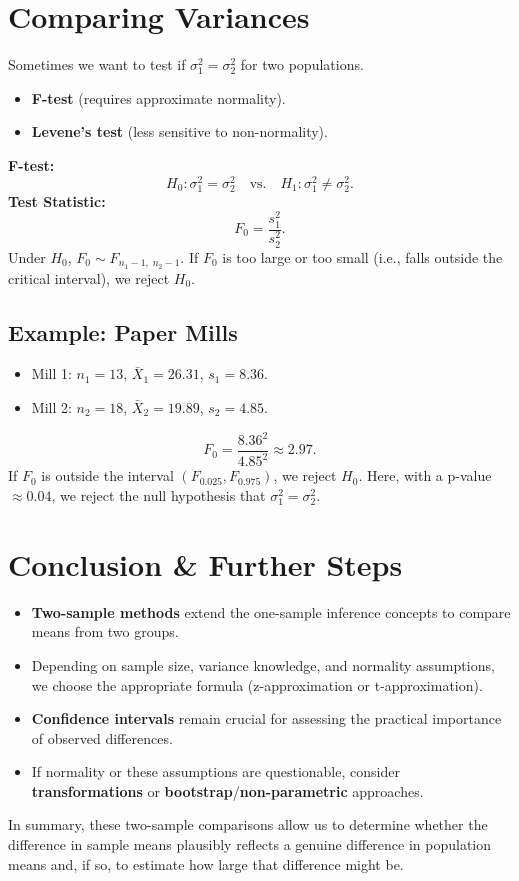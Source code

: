 \documentclass[10pt]{extarticle}
\begin{document}
\bigskip

\section{Comparing Variances}
Sometimes we want to test if $\sigma_1^2 = \sigma_2^2$ for two populations.
\begin{itemize}
    \item \textbf{F-test} (requires approximate normality).
    \item \textbf{Levene’s test} (less sensitive to non-normality).
\end{itemize}
\textbf{F-test:}
\[
H_0: \sigma_1^2 = \sigma_2^2 \quad \text{vs.} \quad H_1: \sigma_1^2 \neq \sigma_2^2.
\]
\textbf{Test Statistic:}
\[
F_0 = \frac{s_1^2}{s_2^2}.
\]
Under $H_0$, $F_0 \sim F_{n_1-1,\;n_2-1}$. If $F_0$ is too large or too small (i.e., falls outside the critical interval), we reject $H_0$.

\subsection*{Example: Paper Mills}
\begin{itemize}
    \item Mill 1: $n_1=13$, $\bar{X}_1=26.31$, $s_1=8.36$.
    \item Mill 2: $n_2=18$, $\bar{X}_2=19.89$, $s_2=4.85$.
\end{itemize}
\[
F_0 = \frac{8.36^2}{4.85^2} \approx 2.97.
\]
If $F_0$ is outside the interval $(F_{0.025}, F_{0.975})$, we reject $H_0$. Here, with a p-value $\approx 0.04$, we reject the null hypothesis that $\sigma_1^2=\sigma_2^2$.


\section{Conclusion \& Further Steps}
\begin{itemize}
    \item \textbf{Two-sample methods} extend the one-sample inference concepts to compare means from two groups.
    \item Depending on sample size, variance knowledge, and normality assumptions, we choose the appropriate formula (z-approximation or t-approximation).
    \item \textbf{Confidence intervals} remain crucial for assessing the practical importance of observed differences.
    \item If normality or these assumptions are questionable, consider \textbf{transformations} or \textbf{bootstrap}/\textbf{non-parametric} approaches.
\end{itemize}
In summary, these two-sample comparisons allow us to determine whether the difference in sample means plausibly reflects a genuine difference in population means and, if so, to estimate how large that difference might be.
\end{document}
